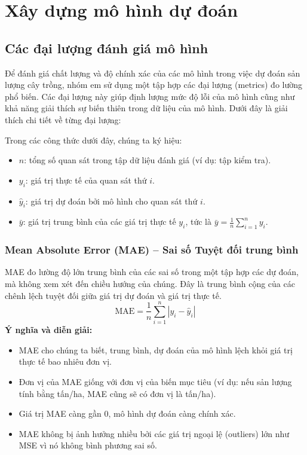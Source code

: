 \section{Xây dựng mô hình dự đoán}
\subsection{Các đại lượng đánh giá mô hình}
\label{subsec:evaluation_metrics_explanation}

Để đánh giá chất lượng và độ chính xác của các mô hình trong việc dự đoán sản lượng cây trồng, nhóm em sử dụng một tập hợp các đại lượng (metrics) đo lường phổ biến. Các đại lượng này giúp định lượng mức độ lỗi của mô hình cũng như khả năng giải thích sự biến thiên trong dữ liệu của mô hình. Dưới đây là giải thích chi tiết về từng đại lượng:

Trong các công thức dưới đây, chúng ta ký hiệu:
\begin{itemize}
    \item $n$: tổng số quan sát trong tập dữ liệu đánh giá (ví dụ: tập kiểm tra).
    \item $y_i$: giá trị thực tế của quan sát thứ $i$.
    \item $\hat{y}_i$: giá trị dự đoán bởi mô hình cho quan sát thứ $i$.
    \item $\bar{y}$: giá trị trung bình của các giá trị thực tế $y_i$, tức là $\bar{y} = \frac{1}{n} \sum_{i=1}^{n} y_i$.
\end{itemize}

\subsubsection{Mean Absolute Error (MAE) – Sai số Tuyệt đối trung bình}
\label{subsubsec:mae_explanation}
MAE đo lường độ lớn trung bình của các sai số trong một tập hợp các dự đoán, mà không xem xét đến chiều hướng của chúng. Đây là trung bình cộng của các chênh lệch tuyệt đối giữa giá trị dự đoán và giá trị thực tế.
\begin{equation}
    \text{MAE} = \frac{1}{n} \sum_{i=1}^{n} |y_i - \hat{y}_i|
    \label{eq:mae}
\end{equation}
\textbf{Ý nghĩa và diễn giải:}
\begin{itemize}
    \item MAE cho chúng ta biết, trung bình, dự đoán của mô hình lệch khỏi giá trị thực tế bao nhiêu đơn vị.
    \item Đơn vị của MAE giống với đơn vị của biến mục tiêu (ví dụ: nếu sản lượng tính bằng tấn/ha, MAE cũng sẽ có đơn vị là tấn/ha).
    \item Giá trị MAE càng gần 0, mô hình dự đoán càng chính xác.
    \item MAE không bị ảnh hưởng nhiều bởi các giá trị ngoại lệ (outliers) lớn như MSE vì nó không bình phương sai số.
\end{itemize}


